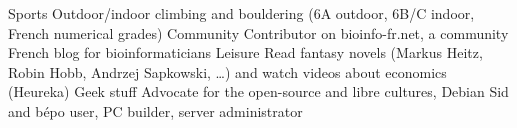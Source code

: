 
\begin{cvskills}

\cvskill
    {Sports} %
    {Outdoor/indoor climbing and bouldering (6A outdoor, 6B/C indoor, French numerical grades)} %
\cvskill
    {Community} %
    {Contributor on bioinfo-fr.net, a community French blog for bioinformaticians} %
\cvskill
    {Leisure} %
    {Read fantasy novels (Markus Heitz, Robin Hobb, Andrzej Sapkowski, …) and watch videos about economics (Heureka)} %
\cvskill
    {Geek stuff} %
    {Advocate for the open-source and libre cultures, Debian Sid and bépo user, PC builder, server administrator} %

\end{cvskills}